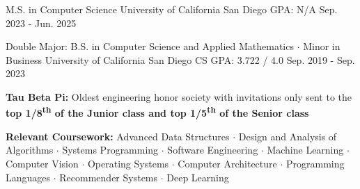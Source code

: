 

\begin{cventries}

  \cventry
    {M.S. in Computer Science} %
    {University of California San Diego} %
    {GPA: N/A} %
    {Sep. 2023 - Jun. 2025} %
    {}
    \vspace{-\baselineskip}

  \cventry
    {Double Major: B.S. in Computer Science and Applied Mathematics $\cdot$ Minor in Business} %
    {University of California San Diego} %
    {CS GPA: 3.722 / 4.0} %
    {Sep. 2019 - Sep. 2023} %
    {
      \begin{cvitems} %
        \item {\textbf{Tau Beta Pi:} Oldest engineering honor society with invitations only sent to the \textbf{top 1/8\textsuperscript{th} of the Junior class and top 1/5\textsuperscript{th} of the Senior class}}
        \item {\textbf{Relevant Coursework:} Advanced Data Structures $\cdot$ Design and Analysis of Algorithms $\cdot$ Systems Programming $\cdot$ Software Engineering $\cdot$ Machine Learning $\cdot$ Computer Vision $\cdot$ Operating Systems $\cdot$ Computer Architecture $\cdot$ Programming Languages $\cdot$ Recommender Systems $\cdot$ Deep Learning}
      \end{cvitems}
    }

\end{cventries}

